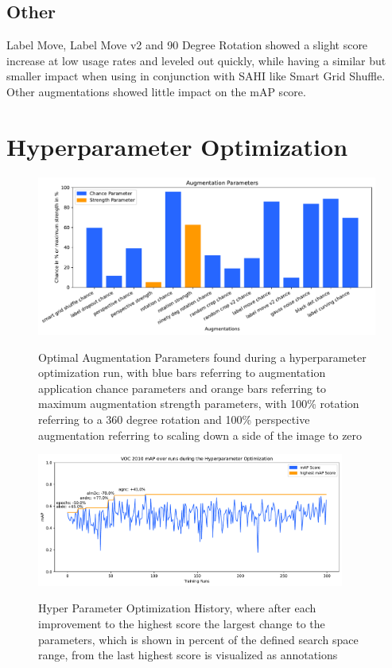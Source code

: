 \documentclass[10pt]{book}
\begin{document}
\subsection{Other} %

Label Move, Label Move v2 and 90 Degree Rotation showed a slight score increase at low usage rates and leveled out quickly, while having a similar but smaller impact when using in conjunction with \ac{SAHI} like Smart Grid Shuffle. Other augmentations showed little impact on the \ac{mAP} score.

\section{Hyperparameter Optimization}

\begin{figure}
  \caption{Optimal Augmentation Parameters found during a hyperparameter optimization run, with blue bars referring to augmentation application chance parameters and orange bars referring to maximum augmentation strength parameters, with 100\% rotation referring to a 360 degree rotation and 100\% perspective augmentation referring to scaling down a side of the image to zero}
  \includegraphics[width=\textwidth]{plot/best_hyp_run_params}
  \label{fig:optimal_augment_params} 
\end{figure} %

\begin{figure}
  \caption{Hyper Parameter Optimization History, where after each improvement to the highest score the largest change to the parameters, which is shown in percent of the defined search space range, from the last highest score is visualized as annotations}
  \includegraphics[width=0.9\textwidth]{image/hyp-param-search-yolov5s-sahi-rc-fix-history}
  \label{fig:hyp_hist}
\end{figure}
\end{document}

